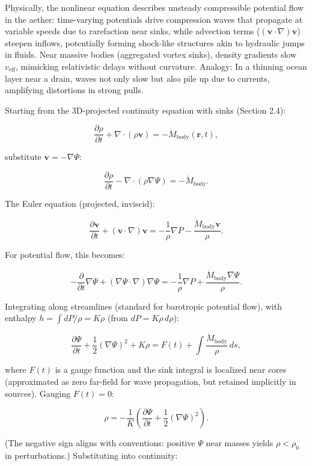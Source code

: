 \documentclass{article}
\begin{document}
Physically, the nonlinear equation describes unsteady compressible potential flow in the aether: time-varying potentials drive compression waves that propagate at variable speeds due to rarefaction near sinks, while advection terms ($( \mathbf{v} \cdot \nabla ) \mathbf{v}$) steepen inflows, potentially forming shock-like structures akin to hydraulic jumps in fluids. Near massive bodies (aggregated vortex sinks), density gradients slow $v_{\text{eff}}$, mimicking relativistic delays without curvature. Analogy: In a thinning ocean layer near a drain, waves not only slow but also pile up due to currents, amplifying distortions in strong pulls.

Starting from the 3D-projected continuity equation with sinks (Section 2.4):

\[
\frac{\partial \rho}{\partial t} + \nabla \cdot (\rho \mathbf{v}) = -\dot{M}_{\text{body}}(\mathbf{r}, t),
\]

substitute $\mathbf{v} = -\nabla \Psi$:

\[
\frac{\partial \rho}{\partial t} - \nabla \cdot (\rho \nabla \Psi) = -\dot{M}_{\text{body}}.
\]

The Euler equation (projected, inviscid):

\[
\frac{\partial \mathbf{v}}{\partial t} + (\mathbf{v} \cdot \nabla) \mathbf{v} = -\frac{1}{\rho} \nabla P - \frac{\dot{M}_{\text{body}} \mathbf{v}}{\rho}.
\]

For potential flow, this becomes:

\[
-\frac{\partial}{\partial t} \nabla \Psi + (\nabla \Psi \cdot \nabla) \nabla \Psi = -\frac{1}{\rho} \nabla P + \frac{\dot{M}_{\text{body}} \nabla \Psi}{\rho}.
\]

Integrating along streamlines (standard for barotropic potential flow), with enthalpy $h = \int dP / \rho = K \rho$ (from $dP = K \rho \, d\rho$):

\[
\frac{\partial \Psi}{\partial t} + \frac{1}{2} (\nabla \Psi)^2 + K \rho = F(t) + \int \frac{\dot{M}_{\text{body}}}{\rho} \, ds,
\]

where $F(t)$ is a gauge function and the sink integral is localized near cores (approximated as zero far-field for wave propagation, but retained implicitly in sources). Gauging $F(t) = 0$:

\[
\rho = -\frac{1}{K} \left( \frac{\partial \Psi}{\partial t} + \frac{1}{2} (\nabla \Psi)^2 \right).
\]

(The negative sign aligns with conventions: positive $\Psi$ near masses yields $\rho < \rho_0$ in perturbations.) Substituting into continuity:
\end{document}
